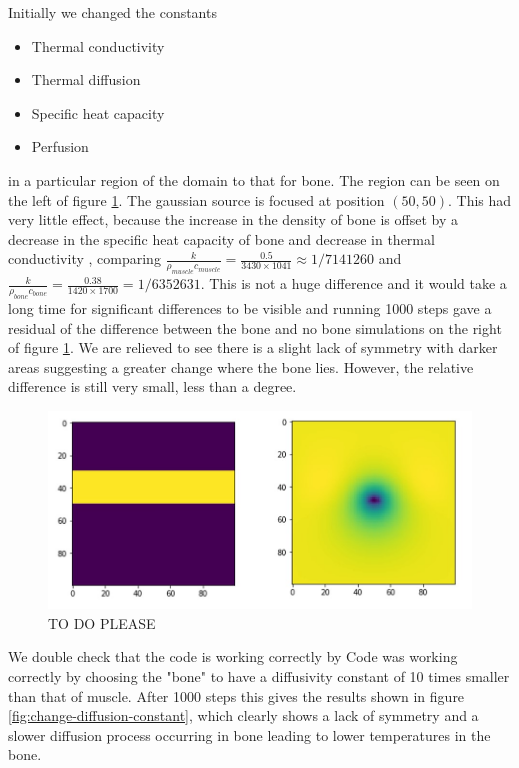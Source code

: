 \documentclass[11pt]{article} %
\begin{document}
Initially we changed the constants

\begin{itemize}
	\item  Thermal conductivity
	\item  Thermal diffusion 
	\item  Specific heat capacity
	\item  Perfusion 
\end{itemize}

in a particular region of the domain to that for bone. The region can be seen on the left of figure \ref{fig:bone-without-changing-q}. The gaussian source is focused at position $(50,50)$.  This had very little effect, because the increase in the density of bone is offset by a decrease in the specific heat capacity of bone and decrease in thermal conductivity , comparing $\frac{k}{\rho_{muscle} c_{muscle}} = \frac{0.5}{3430 \times 1041} \approx 1/7141260 $ and $\frac{k}{\rho_{bone} c_{bone}} =\frac{0.38}{ 1420 \times 1700} =1/ 6352631$. This is not a huge difference and it would take a long time for significant differences to be visible and running 1000 steps gave a residual of the difference between the bone and no bone simulations on the right of figure \ref{fig:bone-without-changing-q}. We are relieved to see there is a slight lack of symmetry with darker areas suggesting a greater change where the bone lies. However, the relative difference is still very small, less than a degree. 

\begin{figure}
	\centering
	\includegraphics[width=0.7\linewidth]{"Report_images/bone without changing Q"}
	\caption{TO DO PLEASE}
	\label{fig:bone-without-changing-q}
\end{figure}

We double check that the code is working correctly by Code was working correctly by choosing the "bone" to have a diffusivity constant of 10 times smaller than that of muscle. After 1000 steps this gives the results shown in figure \ref{fig:change-diffusion-constant}, which clearly shows a lack of symmetry and a slower diffusion process occurring in bone leading to lower temperatures in the bone. 
\end{document}
